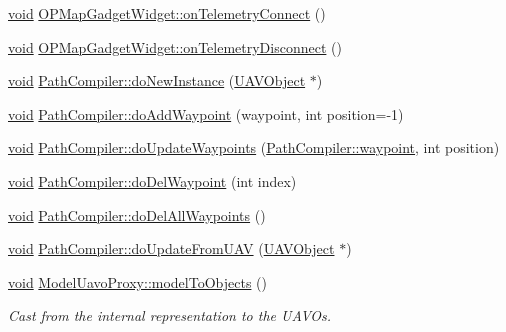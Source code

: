 \begin{DoxyCompactItemize}
\item 
\hyperlink{group___u_a_v_objects_plugin_ga444cf2ff3f0ecbe028adce838d373f5c}{void} \hyperlink{group___o_p_map_plugin_gad7068b438d89bb8f2a9e31ef5ca2d708}{\-O\-P\-Map\-Gadget\-Widget\-::on\-Telemetry\-Connect} ()
\item 
\hyperlink{group___u_a_v_objects_plugin_ga444cf2ff3f0ecbe028adce838d373f5c}{void} \hyperlink{group___o_p_map_plugin_ga723918dc2ebb03ce17180228e4233d06}{\-O\-P\-Map\-Gadget\-Widget\-::on\-Telemetry\-Disconnect} ()
\item 
\hyperlink{group___u_a_v_objects_plugin_ga444cf2ff3f0ecbe028adce838d373f5c}{void} \hyperlink{group___o_p_map_plugin_ga1089b3cd3bacf871b8db6f14a1305819}{\-Path\-Compiler\-::do\-New\-Instance} (\hyperlink{class_u_a_v_object}{\-U\-A\-V\-Object} $\ast$)
\item 
\hyperlink{group___u_a_v_objects_plugin_ga444cf2ff3f0ecbe028adce838d373f5c}{void} \hyperlink{group___o_p_map_plugin_gac62083613851ca96a2d14632d9553171}{\-Path\-Compiler\-::do\-Add\-Waypoint} (waypoint, int position=-\/1)
\item 
\hyperlink{group___u_a_v_objects_plugin_ga444cf2ff3f0ecbe028adce838d373f5c}{void} \hyperlink{group___o_p_map_plugin_gaadeb33c165349ef42df9dffe0d9d7b57}{\-Path\-Compiler\-::do\-Update\-Waypoints} (\hyperlink{class_path_compiler_1_1waypoint}{\-Path\-Compiler\-::waypoint}, int position)
\item 
\hyperlink{group___u_a_v_objects_plugin_ga444cf2ff3f0ecbe028adce838d373f5c}{void} \hyperlink{group___o_p_map_plugin_ga2e7d1eed3bd9981e4f1c7d4bfeeeeba4}{\-Path\-Compiler\-::do\-Del\-Waypoint} (int index)
\item 
\hyperlink{group___u_a_v_objects_plugin_ga444cf2ff3f0ecbe028adce838d373f5c}{void} \hyperlink{group___o_p_map_plugin_ga43eeb28430ee8c4569a8163c34198403}{\-Path\-Compiler\-::do\-Del\-All\-Waypoints} ()
\item 
\hyperlink{group___u_a_v_objects_plugin_ga444cf2ff3f0ecbe028adce838d373f5c}{void} \hyperlink{group___o_p_map_plugin_ga559ab15dae5623715205528a06b9addc}{\-Path\-Compiler\-::do\-Update\-From\-U\-A\-V} (\hyperlink{class_u_a_v_object}{\-U\-A\-V\-Object} $\ast$)
\item 
\hyperlink{group___u_a_v_objects_plugin_ga444cf2ff3f0ecbe028adce838d373f5c}{void} \hyperlink{group___o_p_map_plugin_ga3fdf6b22d36aa34b0eb480ab41cf696e}{\-Model\-Uavo\-Proxy\-::model\-To\-Objects} ()
\begin{DoxyCompactList}\small\item\em \-Cast from the internal representation to the \-U\-A\-V\-Os. \end{DoxyCompactList}\item 

\end{DoxyCompactItemize}
